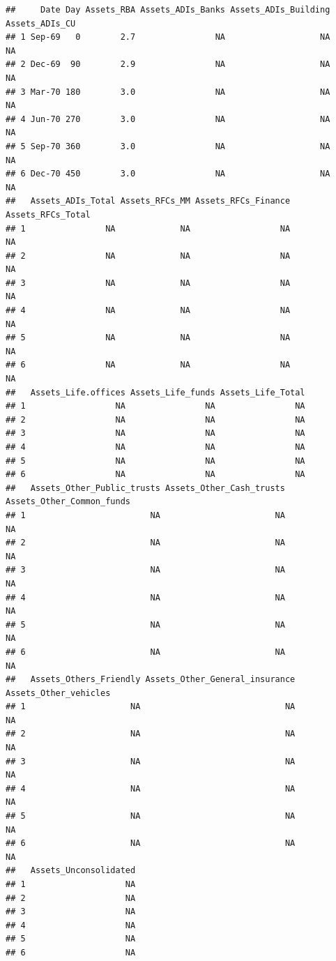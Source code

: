 \documentclass[
]{book}
\begin{document}
\begin{verbatim}
##     Date Day Assets_RBA Assets_ADIs_Banks Assets_ADIs_Building Assets_ADIs_CU
## 1 Sep-69   0        2.7                NA                   NA             NA
## 2 Dec-69  90        2.9                NA                   NA             NA
## 3 Mar-70 180        3.0                NA                   NA             NA
## 4 Jun-70 270        3.0                NA                   NA             NA
## 5 Sep-70 360        3.0                NA                   NA             NA
## 6 Dec-70 450        3.0                NA                   NA             NA
##   Assets_ADIs_Total Assets_RFCs_MM Assets_RFCs_Finance Assets_RFCs_Total
## 1                NA             NA                  NA                NA
## 2                NA             NA                  NA                NA
## 3                NA             NA                  NA                NA
## 4                NA             NA                  NA                NA
## 5                NA             NA                  NA                NA
## 6                NA             NA                  NA                NA
##   Assets_Life.offices Assets_Life_funds Assets_Life_Total
## 1                  NA                NA                NA
## 2                  NA                NA                NA
## 3                  NA                NA                NA
## 4                  NA                NA                NA
## 5                  NA                NA                NA
## 6                  NA                NA                NA
##   Assets_Other_Public_trusts Assets_Other_Cash_trusts Assets_Other_Common_funds
## 1                         NA                       NA                        NA
## 2                         NA                       NA                        NA
## 3                         NA                       NA                        NA
## 4                         NA                       NA                        NA
## 5                         NA                       NA                        NA
## 6                         NA                       NA                        NA
##   Assets_Others_Friendly Assets_Other_General_insurance Assets_Other_vehicles
## 1                     NA                             NA                    NA
## 2                     NA                             NA                    NA
## 3                     NA                             NA                    NA
## 4                     NA                             NA                    NA
## 5                     NA                             NA                    NA
## 6                     NA                             NA                    NA
##   Assets_Unconsolidated
## 1                    NA
## 2                    NA
## 3                    NA
## 4                    NA
## 5                    NA
## 6                    NA
\end{verbatim}
\end{document}
